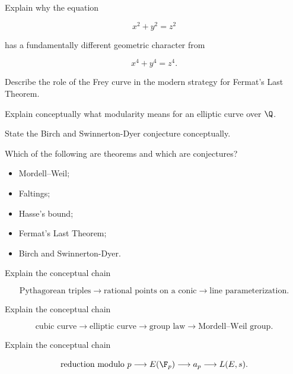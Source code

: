 \begin{exercise}[2]
Explain why the equation

\[ x^2+y^2=z^2 \]

has a fundamentally different geometric character from

\[ x^4+y^4=z^4. \]
\end{exercise}

\begin{exercise}[2]
Describe the role of the Frey curve in the modern strategy for Fermat's Last
Theorem.
\end{exercise}

\begin{exercise}[2]
Explain conceptually what modularity means for an elliptic curve over
\(\Q\).
\end{exercise}

\begin{exercise}[2]
State the Birch and Swinnerton-Dyer conjecture conceptually.
\end{exercise}

\begin{exercise}[2]
Which of the following are theorems and which are conjectures?
\begin{itemize}
    \item Mordell--Weil;
    \item Faltings;
    \item Hasse's bound;
    \item Fermat's Last Theorem;
    \item Birch and Swinnerton-Dyer.
\end{itemize}
\end{exercise}

\begin{exercise}[3]
Explain the conceptual chain

\[
\text{Pythagorean triples}
\longrightarrow
\text{rational points on a conic}
\longrightarrow
\text{line parameterization}.
\]
\end{exercise}

\begin{exercise}[3]
Explain the conceptual chain

\[
\text{cubic curve}
\longrightarrow
\text{elliptic curve}
\longrightarrow
\text{group law}
\longrightarrow
\text{Mordell--Weil group}.
\]
\end{exercise}

\begin{exercise}[3]
Explain the conceptual chain

\[
\text{reduction modulo }p
\longrightarrow
E(\F_p)
\longrightarrow
a_p
\longrightarrow
L(E,s).
\]
\end{exercise}

